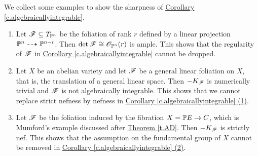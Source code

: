 \begin{exa}
	We collect some examples to show the sharpness of {\hyperref[c.algebraicallyintegrable]{Corollary \ref*{c.algebraicallyintegrable}}}.
	\begin{enumerate}
		\item[(1)] Let $\mathscr F\subseteq T_{\mathbb P^n}$ be the foliation of rank $r$ defined by a linear projection $\mathbb P^n\dashrightarrow \mathbb P^{n-r}$. Then  $\det\mathscr F\cong \mathscr O_{\mathbb P^n}(r)$ is ample. This shows that the regularity of $\mathscr F$ in {\hyperref[c.algebraicallyintegrable]{Corollary \ref*{c.algebraicallyintegrable}}}  cannot be dropped.
		
		\item[(2)] Let $X$ be an abelian variety and let $\mathscr F$ be a general linear foliation on $X$, that is, the translation of a general linear space. Then $-K_{\mathscr F}$ is numerically trivial and $\mathscr F$ is not algebraically integrable. 
		This shows that we cannot replace strict nefness by nefness in {\hyperref[c.algebraicallyintegrable]{Corollary \ref*{c.algebraicallyintegrable} (1)}}.
		
		\item[(3)] Let $\mathscr F$ be the foliation induced by the fibration $X=\mathbb P E\to C$, which is Mumford's example discussed after {\hyperref[t.AD]{Theorem  \ref*{t.AD}}}. Then $-K_{\mathscr F}$ is strictly nef. This shows that the assumption on the fundamental group of $X$ cannot be removed in {\hyperref[c.algebraicallyintegrable]{Corollary \ref*{c.algebraicallyintegrable} (2)}}.
	\end{enumerate}
\end{exa}

\baselineskip